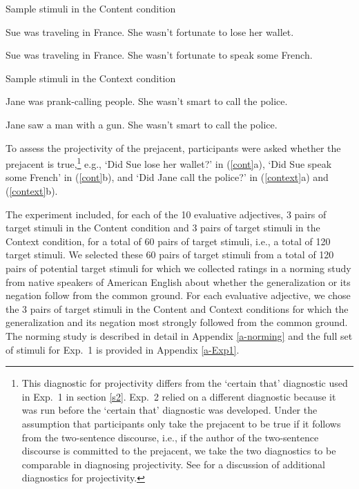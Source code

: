 \documentclass[11pt,fleqn]{article}
\newcommand{\6}{\mbox{$[\hspace*{-.6mm}[$}}
\newcommand{\9}{\mbox{$]\hspace*{-.6mm}]$}}
\begin{document}
\begin{exe}
\ex\label{cont} Sample stimuli in the Content condition 

\begin{xlist}
\ex Sue was traveling in France. She wasn't fortunate to lose her wallet.  

\ex Sue was traveling in France. She wasn't fortunate to speak some French.
\end{xlist}

\ex\label{context} Sample stimuli in the Context condition

\begin{xlist}
\ex Jane was prank-calling people. She wasn't smart to call the police. 

\ex Jane saw a man with a gun. She wasn't smart to call the police. 
\end{xlist}
\end{exe}
To assess the projectivity of the prejacent, participants were asked whether the prejacent is true,\footnote{This diagnostic for projectivity differs from the `certain that' diagnostic used in Exp.~1 in section \ref{s2}. Exp.~2 relied on a different diagnostic because it was run before the `certain that' diagnostic was developed. Under the assumption that participants only take the prejacent to be true if it follows from the two-sentence discourse, i.e., if the author of the two-sentence discourse is committed to the prejacent, we take the two diagnostics to be comparable in diagnosing projectivity. See \citealt{tbd-variability} for a discussion of additional diagnostics for projectivity.} e.g., `Did Sue lose her wallet?' in (\ref{cont}a), `Did Sue speak some French' in (\ref{cont}b), and `Did Jane call the police?' in (\ref{context}a) and (\ref{context}b).

The experiment included, for each of the 10 evaluative adjectives, 3 pairs of target stimuli in the Content condition and 3 pairs of target stimuli in the Context condition, for a total of 60 pairs of target stimuli, i.e., a total of 120 target stimuli. We selected these 60 pairs of target stimuli from a total of 120 pairs of potential target stimuli for which we collected ratings in a norming study from native speakers of American English about whether the generalization or its negation follow from the common ground. For each evaluative adjective, we chose the 3 pairs of target stimuli in the Content and Context conditions for which the generalization and its negation most strongly followed from the common ground. The norming study is described in detail in Appendix \ref{a-norming} and the full set of stimuli for Exp.~1 is provided in Appendix \ref{a-Exp1}.
\end{document}
